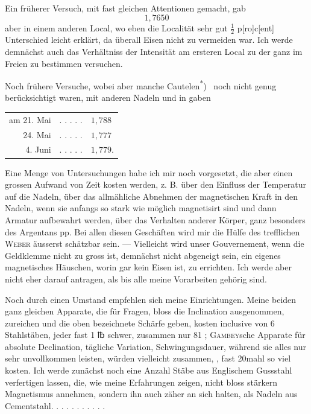 Ein früherer Versuch, mit fast gleichen Attentionen gemacht, gab
\[
1{,}7650
\]
\noindent aber in einem anderen Local, wo eben die Localität sehr gut \(\frac{1}{2}\) p[ro]c[ent]
Unterschied leicht erklärt, da überall Eisen nicht zu vermeiden war. Ich werde
demnächst auch das Verhältniss der Intensität am ersteren Local zu der ganz
im Freien zu bestimmen versuchen.

Noch frühere Versuche, wobei aber manche Cautelen\textsuperscript{*})\begingroup\renewcommand{\thefootnote}{}
\endgroup\ noch nicht genug
berücksichtigt waren, mit anderen Nadeln und in  gaben
\begin{center}
\begin{tabular}{@{}r@{\quad}c@{\quad}l@{}}
am 21. Mai & . . . . . & \(1{,}788\)\\
24. Mai & . . . . . & \(1{,}777\)\\
4. Juni & . . . . . & \(1{,}779\).
\end{tabular}
\end{center}
\noindent\hspace*{\parindent}Eine Menge von Untersuchungen habe ich mir noch vorgesetzt, die aber
einen grossen Aufwand von Zeit kosten werden, z. B. über den Einfluss der
Temperatur auf die Nadeln, über das allmähliche Abnehmen der magnetischen
Kraft in den Nadeln, wenn sie anfangs so stark wie möglich magnetisirt sind
und dann  Armatur aufbewahrt werden, über das
Verhalten anderer Körper, ganz besonders des Argentans pp. Bei allen diesen
Geschäften wird mir die Hülfe des trefflichen \textsc{Weber} äusserst schätzbar sein. —
Vielleicht wird unser Gouvernement, wenn die Geldklemme nicht zu gross ist,
demnächst nicht abgeneigt sein, ein eigenes magnetisches Häuschen, worin gar
kein Eisen ist, zu errichten. Ich werde aber nicht eher darauf antragen, als
bis alle meine Vorarbeiten gehörig  sind.

Noch durch einen Umstand empfehlen sich meine Einrichtungen. Meine
beiden ganz gleichen Apparate, die für  Fragen, bloss die Inclination
ausgenommen, zureichen und die oben bezeichnete Schärfe geben, kosten
inclusive von 6 Stahlstäben, jeder fast 1 {℔} schwer, zusammen nur 81 \HistoricalCurrencyLSeven;
\textsc{Gambey}sche Apparate für absolute Declination, tägliche Variation, Schwingungsdauer,
während sie alles nur sehr unvollkommen leisten, würden vielleicht
zusammen, , fast 20mahl so viel kosten. Ich werde zunächst
\clearpage{}
\noindent noch eine Anzahl Stäbe aus Englischem Gussstahl verfertigen lassen, die, wie
meine Erfahrungen zeigen, nicht bloss stärkern Magnetismus annehmen, sondern
ihn auch zäher an sich halten, als Nadeln aus Cementstahl. . . . . . . . . . .
\clearpage\endgroup
